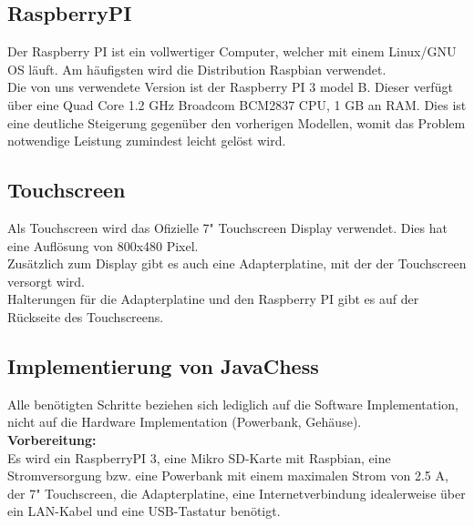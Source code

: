 \documentclass[12pt,a4paper]{article}
\begin{document}
{\subsection{RaspberryPI}

Der Raspberry PI ist ein vollwertiger Computer, welcher mit einem Linux/GNU OS läuft. Am häufigsten wird die Distribution Raspbian verwendet. \\
Die von uns verwendete Version ist der Raspberry PI 3 model B. Dieser verfügt über eine Quad Core 1.2 GHz Broadcom BCM2837 CPU, 1 GB an RAM.\cite{RaspiSpecs} Dies ist eine deutliche Steigerung gegenüber den vorherigen Modellen, womit das Problem notwendige Leistung zumindest leicht gelöst wird. \\

\subsection{Touchscreen}

Als Touchscreen wird das Ofizielle 7" Touchscreen Display verwendet. Dies hat eine Auflösung von 800x480 Pixel.\cite{RaspiScreen} \\
Zusätzlich zum Display gibt es auch eine Adapterplatine, mit der der Touchscreen versorgt wird. \\
Halterungen für die Adapterplatine und den Raspberry PI gibt es auf der Rückseite des Touchscreens.

\subsection{Implementierung von JavaChess}

Alle benötigten Schritte beziehen sich lediglich auf die Software Implementation, nicht auf die Hardware Implementation (Powerbank, Gehäuse). \\[1ex]

\textbf{Vorbereitung:} \\[2ex]
Es wird ein RaspberryPI 3, eine Mikro SD-Karte mit Raspbian, eine Stromversorgung bzw. eine Powerbank mit einem maximalen Strom von 2.5 A, der 7" Touchscreen, die Adapterplatine, eine Internetverbindung idealerweise über ein LAN-Kabel und eine USB-Tastatur benötigt. \\

}
\end{document}
